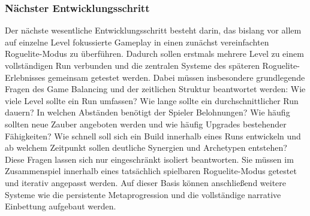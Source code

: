 
\subsubsection{Nächster Entwicklungsschritt}
Der nächste wesentliche Entwicklungsschritt besteht darin, das bislang vor allem auf einzelne Level fokussierte Gameplay in einen zunächst vereinfachten Roguelite-Modus zu überführen.
Dadurch sollen erstmals mehrere Level zu einem vollständigen Run verbunden und die zentralen Systeme des späteren Roguelite-Erlebnisses gemeinsam getestet werden.
Dabei müssen insbesondere grundlegende Fragen des Game Balancing und der zeitlichen Struktur beantwortet werden:
Wie viele Level sollte ein Run umfassen? Wie lange sollte ein durchschnittlicher Run dauern? In welchen Abständen benötigt der Spieler Belohnungen? Wie häufig sollten neue Zauber angeboten werden und wie häufig Upgrades bestehender Fähigkeiten? Wie schnell soll sich ein Build innerhalb eines Runs entwickeln und ab welchem Zeitpunkt sollen deutliche Synergien und Archetypen entstehen?
Diese Fragen lassen sich nur eingeschränkt isoliert beantworten. Sie müssen im Zusammenspiel innerhalb eines tatsächlich spielbaren Roguelite-Modus getestet und iterativ angepasst werden.
Auf dieser Basis können anschließend weitere Systeme wie die persistente Metaprogression und die vollständige narrative Einbettung aufgebaut werden.

